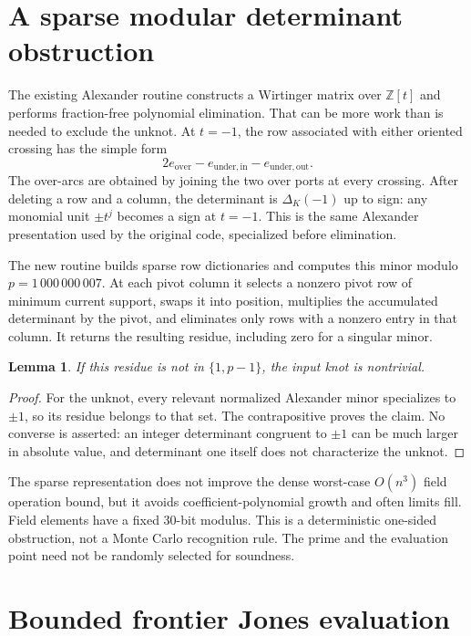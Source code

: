 \documentclass[11pt,letterpaper]{article}
\newtheorem{lemma}[theorem]{Lemma}
\theoremstyle{definition}
\begin{document}
\section[Modular determinant]{A sparse modular determinant obstruction}\label{sec:det}

The existing Alexander routine constructs a Wirtinger matrix over
$\mathbb Z[t]$ and performs fraction-free polynomial elimination. That can be
more work than is needed to exclude the unknot. At $t=-1$, the row associated
with either oriented crossing has the simple form
\begin{equation}\label{eq:fox}
 2e_{\mathrm{over}}-e_{\mathrm{under,in}}-e_{\mathrm{under,out}}.
\end{equation}
The over-arcs are obtained by joining the two over ports at every crossing.
After deleting a row and a column, the determinant is $\Delta_K(-1)$ up to sign:
any monomial unit $\pm t^j$ becomes a sign at $t=-1$. This is the same Alexander
presentation used by the original code, specialized before elimination.

The new routine builds sparse row dictionaries and computes this minor modulo
$p=1\,000\,000\,007$. At each pivot column it selects a nonzero pivot row of
minimum current support, swaps it into position, multiplies the accumulated
determinant by the pivot, and eliminates only rows with a nonzero entry in that
column. It returns the resulting residue, including zero for a singular minor.

\begin{lemma}
If this residue is not in $\{1,p-1\}$, the input knot is nontrivial.
\end{lemma}
\begin{proof}
For the unknot, every relevant normalized Alexander minor specializes to
$\pm1$, so its residue belongs to that set. The contrapositive proves the claim.
No converse is asserted: an integer determinant congruent to $\pm1$ can be much
larger in absolute value, and determinant one itself does not characterize the
unknot.
\end{proof}

The sparse representation does not improve the dense worst-case $O(n^3)$ field
operation bound, but it avoids coefficient-polynomial growth and often limits
fill. Field elements have a fixed 30-bit modulus. This is a deterministic
one-sided obstruction, not a Monte Carlo recognition rule. The prime and the
evaluation point need not be randomly selected for soundness.

\section[Frontier Jones evaluation]{Bounded frontier Jones evaluation}\label{sec:jones}
\end{document}
